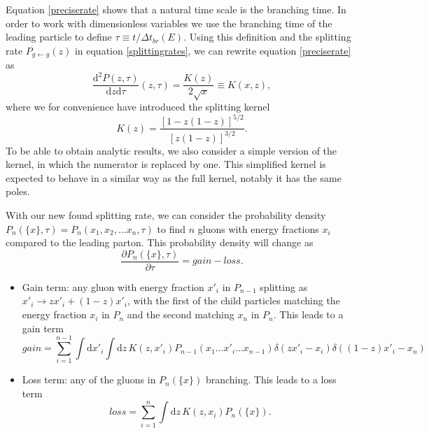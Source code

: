 \documentclass[a4paper,12pt]{article}
\newcommand{\party}[2]{\frac{\partial{#1}}{\partial{#2}}}
\numberwithin{equation}{section}
\begin{document}
Equation \eqref{preciserate} shows that a natural time scale is the branching time. In order to work with dimensionless variables we use the branching time of the leading particle to define $\tau \equiv t/\Delta t_{br}(E)$. Using this definition and the splitting rate $P_{g \leftarrow g}(z)$ in equation \eqref{splittingrates}, we can rewrite equation \eqref{preciserate} as
\begin{equation}\label{ratewithkernel}
\frac{\mathrm{d}^2 P(z,\tau)}{\mathrm{d}z\mathrm{d}\tau}(z,\tau)=\frac{K(z)}{2 \sqrt{x}} \equiv K(x,z),
\end{equation}
where we for convenience have introduced the splitting kernel
\begin{equation}\label{kernel}
K(z)=\frac{[1-z(1-z)]^{5/2}}{[z(1-z)]^{3/2}}.
\end{equation}
To be able to obtain analytic results, we also consider a simple version of the kernel, in which the numerator is replaced by one. This simplified kernel is expected to behave in a similar way as the full kernel, notably it has the same poles.

With our new found splitting rate, we can consider the probability density ${P_n(\{x\},\tau)}=P_n(x_1,x_2,...x_n,\tau)$ to find $n$ gluons with energy fractions $x_i$ compared to the leading parton. This probability density will change as
\begin{equation}\label{Pevo}
\party{P_n(\{x\},\tau)}{\tau}=gain-loss.
\end{equation}
\begin{itemize}
\item Gain term: any gluon with energy fraction $x'_i$ in $P_{n-1}$ splitting as $x'_i \rightarrow z x'_i + (1-z)x'_i$, with the first of the child particles matching the energy fraction $x_i$ in $P_n$ and the second matching $x_n$ in $P_n$. This leads to a gain term 
\begin{equation}
gain=\sum_{i=1}^{n-1} \int \mathrm{d}x'_i \int \mathrm{d}z\, K(z,x'_i) P_{n-1}(x_1...x'_i...x_{n-1}) \delta(zx'_i-x_i)\delta((1-z)x'_i-x_n)
\end{equation}
\item Loss term: any of the gluons in $P_n(\{x\})$ branching. This leads to a loss term
\begin{equation}
loss=\sum_{i=1}^n \int \mathrm{d}z\, K(z,x_i) P_n(\{x\}).
\end{equation}
\end{itemize} 
\end{document}
